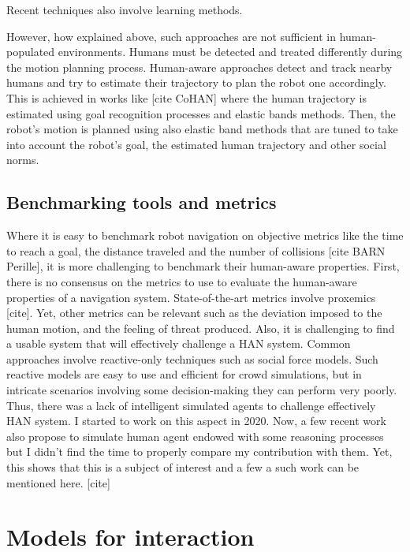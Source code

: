 Recent techniques also involve learning methods.

However, how explained above, such approaches are not sufficient in human-populated environments. Humans must be detected and treated differently during the motion planning process. Human-aware approaches detect and track nearby humans and try to estimate their trajectory to plan the robot one accordingly. This is achieved in works like [cite CoHAN] where the human trajectory is estimated using goal recognition processes and elastic bands methods. Then, the robot's motion is planned using also elastic band methods that are tuned to take into account the robot's goal, the estimated human trajectory and other social norms.   

\subsection{Benchmarking tools and metrics}

Where it is easy to benchmark robot navigation on objective metrics like the time to reach a goal, the distance traveled and the number of collisions [cite BARN Perille], it is more challenging to benchmark their human-aware properties.
First, there is no consensus on the metrics to use to evaluate the human-aware properties of a navigation system. State-of-the-art metrics involve proxemics [cite]. Yet, other metrics can be relevant such as the deviation imposed to the human motion, and the feeling of threat produced.
Also, it is challenging to find a usable system that will effectively challenge a HAN system. 
Common approaches involve reactive-only techniques such as social force models. Such reactive models are easy to use and efficient for crowd simulations, but in intricate scenarios involving some decision-making they can perform very poorly. Thus, there was a lack of intelligent simulated agents to challenge effectively HAN system.
I started to work on this aspect in 2020. Now, a few recent work also propose to simulate human agent endowed with some reasoning processes but I didn't find the time to properly compare my contribution with them. Yet, this shows that this is a subject of interest and a few a such work can be mentioned here. [cite]


\section{Models for interaction}

